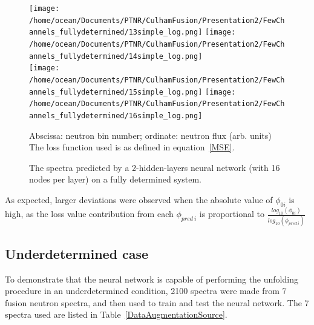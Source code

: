 \documentclass[a4paper, 12pt]{article}
\begin{document}
\begin{figure}
\centering
\texttt{[image: /home/ocean/Documents/PTNR/CulhamFusion/Presentation2/FewChannels\_fullydetermined/13simple\_log.png]}
\texttt{[image: /home/ocean/Documents/PTNR/CulhamFusion/Presentation2/FewChannels\_fullydetermined/14simple\_log.png]}\\
\texttt{[image: /home/ocean/Documents/PTNR/CulhamFusion/Presentation2/FewChannels\_fullydetermined/15simple\_log.png]}
\texttt{[image: /home/ocean/Documents/PTNR/CulhamFusion/Presentation2/FewChannels\_fullydetermined/16simple\_log.png]}
\caption{The spectra predicted by a 2-hidden-layers neural network (with 16 nodes per layer) on a fully determined system.} \label{5x5}
Abscissa: neutron bin number; ordinate: neutron flux (arb. units)\\
The loss function used is as defined in equation~\ref{MSE}.
\end{figure}

As expected, larger deviations were observed when the absolute value of $\phi_{0i}$ is high, as the loss value contribution from each $\phi_{pred\:i}$ is proportional to $\frac{log_{10}(\phi_{0i})}{log_{10}(\phi_{pred\:i})}$

\subsection{Underdetermined case}\label{Underdetermined case}
To demonstrate that the neural network is capable of performing the unfolding procedure in an underdetermined condition, 2100 spectra were made from 7 fusion neutron spectra, and then used to train and test the neural network. The 7 spectra used are listed in Table~\ref{DataAugmentationSource}.
\end{document}
